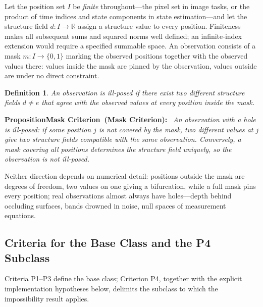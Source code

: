 \documentclass[twoside,11pt]{article}
\newtheorem{defn}{Definition}
\newenvironment{uprop}[1][]{\par\medskip\noindent\textbf{Proposition\ifx\relax#1\relax\else\ (#1)\fi:}\ \itshape}{\par\medskip} %
\begin{document}
Let the position set $I$ be \emph{finite} throughout---the pixel set in image tasks, or the product of time indices and state components in state estimation---and let the structure field $d : I \to \mathbb{R}$ assign a structure value to every position. Finiteness makes all subsequent sums and squared norms well defined; an infinite-index extension would require a specified summable space. An observation consists of a mask $m : I \to \{0,1\}$ marking the observed positions together with the observed values there: values inside the mask are pinned by the observation, values outside are under no direct constraint.

\begin{defn}
An observation is \emph{ill-posed} if there exist two different structure fields $d \neq e$ that agree with the observed values at every position inside the mask.
\end{defn}

\begin{uprop}[Mask Criterion]
An observation with a hole is ill-posed: if some position $j$ is not covered by the mask, two different values at $j$ give two structure fields compatible with the same observation. Conversely, a mask covering all positions determines the structure field uniquely, so the observation is not ill-posed.
\end{uprop}

Neither direction depends on numerical detail: positions outside the mask are degrees of freedom, two values on one giving a bifurcation, while a full mask pins every position; real observations almost always have holes---depth behind occluding surfaces, bands drowned in noise, null spaces of measurement equations.

\subsection{Criteria for the Base Class and the P4 Subclass}

Criteria P1--P3 define the base class; Criterion P4, together with the explicit implementation hypotheses below, delimits the subclass to which the impossibility result applies.
\end{document}
